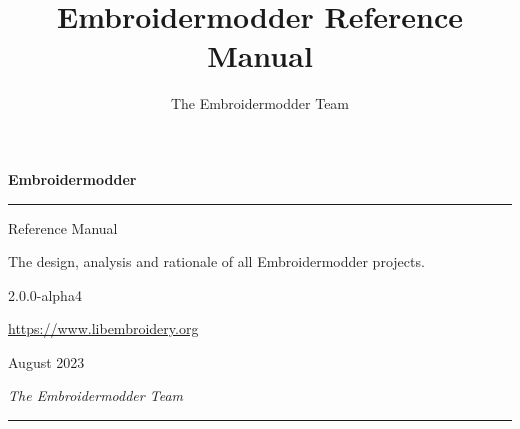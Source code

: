 \documentclass[10pt]{report}
\title{Embroidermodder Reference Manual \embversion}
\author{The Embroidermodder Team}
\newcommand{\embversion}{2.0.0-alpha4}
\newcommand{\publicationdate}{August 2023}
\begin{document}
\begin{titlepage}

\vspace*{8cm}

\noindent\textbf{\Huge Embroidermodder}

\vspace{10pt}

\noindent\rule{\linewidth}{2pt}

\vspace{10pt}

\begin{flushright}
\Large
    Reference Manual

\normalsize
    The design, analysis and rationale of all Embroidermodder projects.

\embversion

\vspace{10pt}

\url{https://www.libembroidery.org}

\publicationdate
\end{flushright}

\vspace{6cm}

\begin{flushleft}
\Large
\emph{The Embroidermodder Team}


\vspace{10pt}

\noindent\rule{\linewidth}{1pt}

\end{flushleft}
    
\end{titlepage}


\vspace*{8cm}
\end{document}
